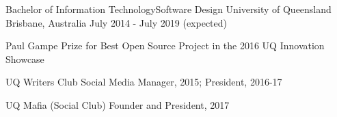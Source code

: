 


\begin{cventries}


\cventry
{Bachelor of Information Technology{\enskip\cdotp\enskip}Software Design} %
{University of Queensland} %
{Brisbane, Australia} %
{July 2014 - July 2019 (expected)} %
{ %
\begin{cvitems}
\item {Paul Gampe Prize for Best Open Source Project in the 2016 UQ Innovation Showcase}
\item {UQ Writers Club Social Media Manager, 2015; President, 2016-17}
\item {UQ Mafia (Social Club) Founder and President, 2017}
\end{cvitems}
}


\end{cventries}